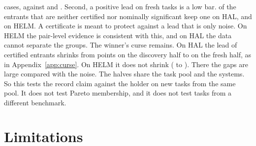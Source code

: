 \documentclass[11pt]{article}
\begin{document}
cases, against \NumReplHalLLOthSig{} and \NumReplHelmLLOthSig{}. Second, a positive lead on fresh tasks is a low bar. \NumReplHalOthPos{} of the entrants that are neither certified nor nominally significant keep one on HAL, and \NumReplHelmOthPos{} on HELM. A certificate is meant to protect against a lead that is only noise. On HELM the pair-level evidence is consistent with this, and on HAL the data cannot separate the groups. The winner's curse remains. On HAL the lead of certified entrants shrinks from \NumReplHalCertLeadD{} points on the discovery half to \NumReplHalCertLeadV{} on the fresh half, as in Appendix~\ref{app:curse}. On HELM it does not shrink (\NumReplHelmCertLeadD{} to \NumReplHelmCertLeadV{}). There the gaps are large compared with the noise. The halves share the task pool and the systems. So this tests the record claim against the holder on new tasks from the same pool. It does not test Pareto membership, and it does not test tasks from a different benchmark.

\section{Limitations}
\label{sec:limits}
\end{document}
